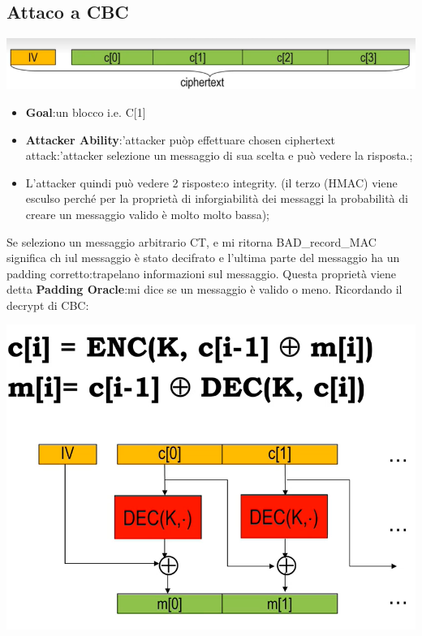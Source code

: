 \documentclass{book}
\theoremstyle{remark}
\begin{document}
\subsection{Attaco a CBC}
\begin{center}
	\includegraphics[scale=0.4]{AttackDEC.png}
\end{center}
\begin{itemize}
	\item \textbf{Goal}:\@Decifrare un blocco i\@.e\@. C[1]
	\item \textbf{Attacker Ability}:\@l'attacker puòp effettuare chosen ciphertext attack:\@l'attacker selezione un messaggio di sua scelta e può vedere la risposta\@.;\@
	\item L'attacker quindi può vedere 2 risposte:\@decryption o integrity\@. (il terzo  (HMAC) viene esculso perché per la proprietà di inforgiabilità dei messaggi la probabilità di creare un messaggio valido è molto molto bassa);\@
\end{itemize}
Se seleziono un messaggio arbitrario CT, e mi ritorna BAD\_record\_MAC significa ch iul messaggio è stato decifrato e l'ultima parte del messaggio ha un padding corretto:\@si trapelano informazioni sul messaggio\@. Questa proprietà viene detta \textbf{Padding Oracle}:\@qualcuno mi dice se un messaggio è valido o meno\@. Ricordando il decrypt di CBC:
\begin{center}
	\includegraphics[scale=0.4]{CBCDecrypt.png}
\end{center}
\end{document}
